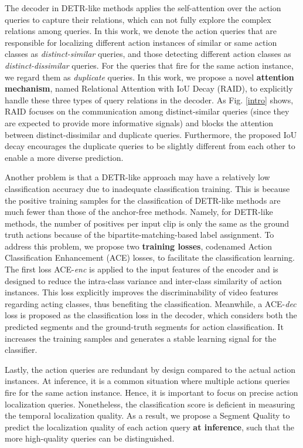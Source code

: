 \documentclass[runningheads]{llncs}
\newcommand{\figref}[1]{Fig. \ref{#1}}
\def\att{RAID }
\def\score{Segment Quality }
\begin{document}
The decoder in DETR-like methods applies the self-attention over the action queries to capture their relations, which can not fully explore the complex relations among queries.
In this work, we denote the action queries that are responsible for localizing different action instances of similar or same action classes as \emph{distinct-similar} queries, and those detecting different action classes as \emph{distinct-dissimilar} queries. For the queries that fire for the same action instance, we regard them as \emph{duplicate} queries.
In this work, we propose a novel \textbf{attention mechanism}, named Relational Attention with IoU Decay (RAID), to explicitly handle these three types of query relations in the decoder.
As \figref{intro} shows, \att focuses on the communication among distinct-similar queries (since they are expected to provide more informative signals) and blocks the attention between distinct-dissimilar and duplicate queries. Furthermore, the proposed IoU decay encourages the duplicate queries to be slightly different from each other to enable a more diverse prediction.


Another problem is that a DETR-like approach may have a relatively low classification accuracy due to inadequate classification training. This is because the positive training samples for the classification of DETR-like methods are much fewer than those of the anchor-free methods. Namely, 
for DETR-like methods, the number of positives per input clip is only the same as the ground truth actions because of the bipartite-matching-based label assignment.
To address this problem, we propose two \textbf{training losses}, codenamed Action Classification Enhancement (ACE) losses, to facilitate the classification learning. The first loss ACE-\emph{enc} is applied to the input features of the encoder and is designed to reduce the intra-class variance and inter-class similarity of action instances. This loss explicitly improves the discriminability of video features regarding acting classes, thus benefiting the classification. Meanwhile, a ACE-\emph{dec} loss is proposed as the classification loss in the decoder, which considers both the predicted segments and the ground-truth segments for action classification. It increases the training samples and generates a stable learning signal for the classifier.

Lastly, the action queries are redundant by design compared to the actual action instances. 
At inference, it is a common situation where multiple actions queries fire for the same action instance. 
Hence, it is important to focus on precise action localization queries. 
Nonetheless, the classification score is deficient in measuring the temporal localization quality.
As a result, we propose a \score to predict the localization quality of each action query \textbf{at inference}, such that the more high-quality queries can be distinguished. 
\end{document}
